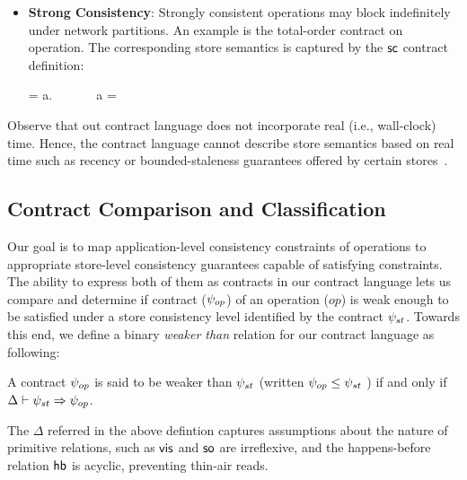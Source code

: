 \begin{itemize}
\item \textbf{Strong Consistency}: Strongly consistent operations may block
  indefinitely under network partitions. An example is the total-order
  contract on  operation. The corresponding store semantics is
  captured by the ${\sf sc}$ contract definition:

  \vspace{-1em}
  \begin{smathpar}
  \scc = \forall a.~ \Rightarrow {} ~\vee~  ~\vee~ a = \cureff
  \end{smathpar}

\end{itemize}

Observe that out contract language does not incorporate real (i.e.,
wall-clock) time. Hence, the contract language cannot describe store
semantics based on real time such as recency or bounded-staleness
guarantees offered by certain stores~\cite{Pileus}.




\subsection{Contract Comparison and Classification}

Our goal is to map application-level consistency constraints of
operations to appropriate store-level consistency guarantees capable
of satisfying constraints.  The ability to express both of them as
contracts in our contract language lets us compare and determine if
contract ($\psi_{op}$) of an operation ($op$) is weak enough to be
satisfied under a store consistency level identified by the contract
$\psi_{st}$. Towards this end, we define a binary \emph{weaker than}
relation for our contract language as following:

\begin{definition}
A contract $\psi_{op}$ is said to be weaker than $\psi_{st}$ (written $\psi_{op}
\le \psi_{st}$ ) if and only if $\Delta \vdash \psi_{st} \Rightarrow \psi_{op}$.
\begin{center}
\end{center}
\end{definition}

\vspace{-1em}
\noindent The $\Delta$ referred in the above defintion captures
assumptions about the nature of primitive relations, such as ${\normalfont \textsf{vis}}$
and ${\normalfont \textsf{so}}$ are irreflexive, and the happens-before relation ${\normalfont \textsf{hb}}$ is
acyclic, preventing thin-air reads.

